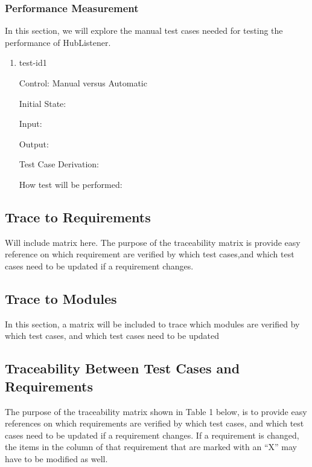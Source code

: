 \documentclass[12pt, titlepage]{article}
\begin{document}
\subsubsection{Performance Measurement}

In this section, we will explore the manual test cases needed for testing the performance of HubListener. 
\begin{enumerate}
\item{test-id1\\}

Control: Manual versus Automatic
					
Initial State: 
					
Input: 
					
Output: 

Test Case Derivation: 
					
How test will be performed: 
\end{enumerate}
		
\subsection{Trace to Requirements}

Will include matrix here. The purpose of the traceability matrix is provide easy reference on which requirement are verified by which test cases,and which test cases need to be updated if a requirement changes. 
		
\subsection{Trace to Modules}		

In this section, a matrix will  be included to trace which modules are verified by which test cases, and which test cases need to be updated 

\fi

\subsection{Traceability Between Test Cases and Requirements}

\noindent The purpose of the traceability matrix shown in Table 1 below, is to provide easy references on which requirements are verified by which test cases, and which test cases need to be updated if a requirement changes.  If a requirement is changed, the items in the column of that requirement that are marked with an ``X'' may have to be modified as well. 
\end{document}
